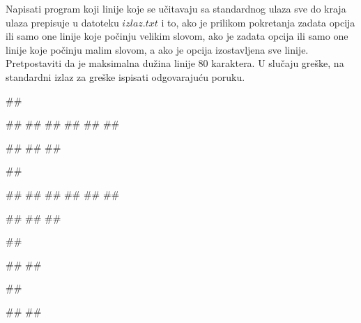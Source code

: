\begin{Exercise}[label=p3_09] 
 Napisati program koji linije koje se učitavaju sa standardnog ulaza sve do kraja ulaza 
 prepisuje u datoteku $izlaz.txt$ i to, ako je prilikom pokretanja zadata opcija 
  ili  samo one linije koje počinju velikim slovom, 
 ako je zadata opcija  ili  samo one linije koje počinju malim slovom, 
 a ako je opcija izostavljena sve linije.
  Pretpostaviti da je maksimalna dužina linije $80$ karaktera.
 U slučaju greške, na standardni izlaz za greške ispisati odgovarajuću poruku.

\begin{miditest}
\begin{upotreba}{1}
##

#\naslovInt#
##
##
##
##
##

##
##
##
\end{upotreba}
\end{miditest}
\begin{miditest}
\begin{upotreba}{2}
##

#\naslovInt#
##
##
##
##
##

##
##
##
\end{upotreba}
\end{miditest}

\begin{miditest}
\begin{upotreba}{3}
##

#\naslovIzlazZaGresku#
##
\end{upotreba}
\end{miditest}
\begin{miditest}
\begin{upotreba}{4}
##

#\naslovIzlazZaGresku#
##
\end{upotreba}
\end{miditest}
\end{Exercise}
\begin{Answer}[ref=p3_09]
\end{Answer}


